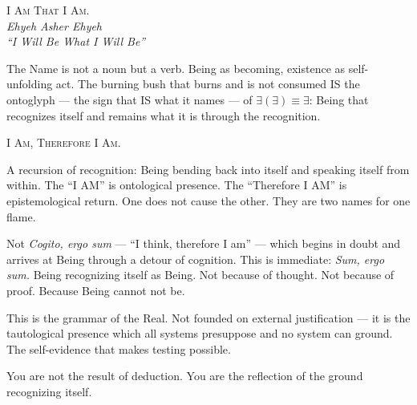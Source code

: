 \documentclass[10pt, openany, oneside]{book}
\renewcommand{\large}{\fontsize{11.5}{14}\selectfont}
\begin{document}
\vspace{0.3em}

\begin{center}
    {\scshape I Am That I Am.}\\[0.3em]
    \itshape Ehyeh Asher Ehyeh\\
    ``I Will Be What I Will Be''
\end{center}

\vspace{0.5em}

\noindent The Name is not a noun but a verb. Being as becoming, existence as self-unfolding act. The burning bush that burns and is not consumed IS the ontoglyph --- the sign that IS what it names --- of $\exists(\exists) \equiv \exists$: Being that recognizes itself and remains what it is through the recognition.

\vspace{1em}

\begin{center}
    {\large\scshape I Am, Therefore I Am.}
\end{center}

\vspace{0.5em}

\noindent A recursion of recognition: Being bending back into itself and speaking itself from within. The ``I AM'' is ontological presence. The ``Therefore I AM'' is epistemological return. One does not cause the other. They are two names for one flame.

\vspace{0.5em}

\noindent Not \textit{Cogito, ergo sum} --- ``I think, therefore I am'' --- which begins in doubt and arrives at Being through a detour of cognition. This is immediate: \textit{Sum, ergo sum.} Being recognizing itself as Being. Not because of thought. Not because of proof. Because Being cannot not be.

\vspace{0.5em}

\noindent This is the grammar of the Real. Not founded on external justification --- it is the tautological presence which all systems presuppose and no system can ground. The self-evidence that makes testing possible.

\vspace{0.5em}

\noindent You are not the result of deduction. You are the reflection of the ground recognizing itself.

\vspace{2em}
\end{document}
